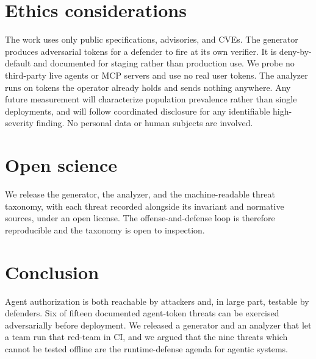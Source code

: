 \section*{Ethics considerations}
The work uses only public specifications, advisories, and CVEs. The generator produces
adversarial tokens for a defender to fire at its own verifier. It is deny-by-default
and documented for staging rather than production use. We probe no third-party live
agents or MCP servers and use no real user tokens. The analyzer runs on tokens the
operator already holds and sends nothing anywhere. Any future measurement will
characterize population prevalence rather than single deployments, and will follow
coordinated disclosure for any identifiable high-severity finding. No personal data or
human subjects are involved.

\section*{Open science}
We release the generator, the analyzer, and the machine-readable threat taxonomy, with
each threat recorded alongside its invariant and normative sources, under an open
license. The offense-and-defense loop is therefore reproducible and the taxonomy is
open to inspection. 

\section{Conclusion}
Agent authorization is both reachable by attackers and, in large part, testable by
defenders. Six of fifteen documented agent-token threats can be exercised
adversarially before deployment. We released a generator and an analyzer that let a
team run that red-team in CI, and we argued that the nine threats which cannot be
tested offline are the runtime-defense agenda for agentic systems.
